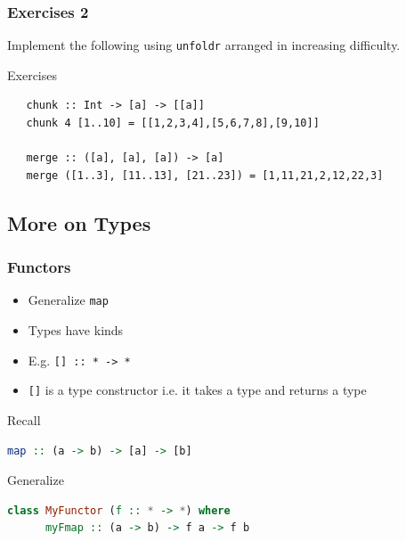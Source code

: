 \documentclass{beamer}
\begin{document}
\begin{frame}[fragile]
\frametitle{Exercises 2}

Implement the following using \texttt{unfoldr} arranged in increasing difficulty.

 \vspace{0.5cm}
 \begin{block}{Exercises}

  \begin{lstlisting}
   chunk :: Int -> [a] -> [[a]]
   chunk 4 [1..10] = [[1,2,3,4],[5,6,7,8],[9,10]]

   merge :: ([a], [a], [a]) -> [a]
   merge ([1..3], [11..13], [21..23]) = [1,11,21,2,12,22,3]
  \end{lstlisting}

 \end{block}

\end{frame}

\subsection{More on Types}
\begin{frame}[fragile]
\frametitle{Functors}

\begin{itemize}
\item Generalize \texttt{map}
\item Types have kinds
\item E.g. \texttt{[] :: * -> *}
\item \texttt{[]} is a type constructor i.e. it takes a type and returns a type
\end{itemize}

\begin{block}{Recall}
  \begin{lstlisting}[language=Haskell]
      map :: (a -> b) -> [a] -> [b]
  \end{lstlisting}
 \end{block}

\begin{block}{Generalize}
  \begin{lstlisting}[language=Haskell]
    class MyFunctor (f :: * -> *) where
      myFmap :: (a -> b) -> f a -> f b
  \end{lstlisting}
 \end{block}

\end{frame}
\end{document}
